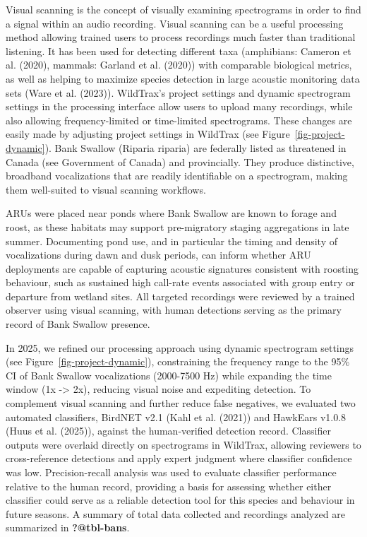 \documentclass[
  letterpaper,
  DIV=11,
  numbers=noendperiod]{scrartcl}
\begin{document}
Visual scanning is the concept of visually examining spectrograms in
order to find a signal within an audio recording. Visual scanning can be
a useful processing method allowing trained users to process recordings
much faster than traditional listening. It has been used for detecting
different taxa (amphibians: Cameron et al. (2020), mammals: Garland et
al. (2020)) with comparable biological metrics, as well as helping to
maximize species detection in large acoustic monitoring data sets (Ware
et al. (2023)). WildTrax's project settings and dynamic spectrogram
settings in the processing interface allow users to upload many
recordings, while also allowing frequency-limited or time-limited
spectrograms. These changes are easily made by adjusting project
settings in WildTrax (see Figure~\ref{fig-project-dynamic}). Bank
Swallow (Riparia riparia) are federally listed as threatened in Canada
(see Government of Canada) and provincially. They produce distinctive,
broadband vocalizations that are readily identifiable on a spectrogram,
making them well-suited to visual scanning workflows.

ARUs were placed near ponds where Bank Swallow are known to forage and
roost, as these habitats may support pre-migratory staging aggregations
in late summer. Documenting pond use, and in particular the timing and
density of vocalizations during dawn and dusk periods, can inform
whether ARU deployments are capable of capturing acoustic signatures
consistent with roosting behaviour, such as sustained high call-rate
events associated with group entry or departure from wetland sites. All
targeted recordings were reviewed by a trained observer using visual
scanning, with human detections serving as the primary record of Bank
Swallow presence.

In 2025, we refined our processing approach using dynamic spectrogram
settings (see Figure~\ref{fig-project-dynamic}), constraining the
frequency range to the 95\% CI of Bank Swallow vocalizations (2000-7500
Hz) while expanding the time window (1x -\textgreater{} 2x), reducing
visual noise and expediting detection. To complement visual scanning and
further reduce false negatives, we evaluated two automated classifiers,
BirdNET v2.1 (Kahl et al. (2021)) and HawkEars v1.0.8 (Huus et al.
(2025)), against the human-verified detection record. Classifier outputs
were overlaid directly on spectrograms in WildTrax, allowing reviewers
to cross-reference detections and apply expert judgment where classifier
confidence was low. Precision-recall analysis was used to evaluate
classifier performance relative to the human record, providing a basis
for assessing whether either classifier could serve as a reliable
detection tool for this species and behaviour in future seasons. A
summary of total data collected and recordings analyzed are summarized
in \textbf{?@tbl-bans}.
\end{document}
